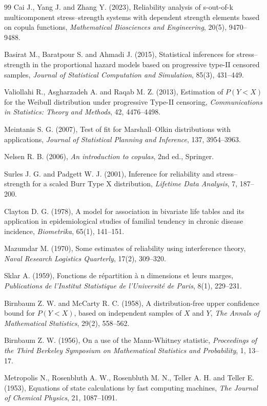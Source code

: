 \documentclass[twoside]{article}
\begin{document}
\begin{thebibliography}{99}
	Cai J., Yang J. and Zhang Y. (2023), Reliability analysis of s-out-of-k multicomponent stress--strength systems with dependent strength elements based on copula functions, {\it Mathematical Biosciences and Engineering}, 20(5), 9470--9488.
	
	
	Basirat M., Baratpour S. and Ahmadi J. (2015), Statistical inferences for stress--strength in the proportional hazard models based on progressive type-II censored samples, {\it Journal of Statistical Computation and Simulation}, 85(3), 431--449.
	
	Valiollahi R., Asgharzadeh A. and Raqab M. Z. (2013), Estimation of \(P(Y < X)\) for the Weibull distribution under progressive Type-II censoring, {\it Communications in Statistics: Theory and Methods}, 42, 4476--4498.
	
	
	Meintanis S. G. (2007), Test of fit for Marshall--Olkin distributions with applications, {\it Journal of Statistical Planning and Inference}, 137, 3954--3963.
	
	Nelsen R. B. (2006), {\it An introduction to copulas}, 2nd ed., Springer.
	
	
	Surles J. G. and Padgett W. J. (2001), Inference for reliability and stress--strength for a scaled Burr Type X distribution, {\it Lifetime Data Analysis}, 7, 187--200.
	
	
	Clayton D. G. (1978), A model for association in bivariate life tables and its application in epidemiological studies of familial tendency in chronic disease incidence, {\it Biometrika}, 65(1), 141--151.
	
	Mazumdar M. (1970), Some estimates of reliability using interference theory, {\it Naval Research Logistics Quarterly}, 17(2), 309--320.
	
	Sklar A. (1959), Fonctions de r\'{e}partition \`{a} n dimensions et leurs marges, {\it Publications de l'Institut Statistique de l'Universit\'{e} de Paris}, 8(1), 229--231.
	
	Birnbaum Z. W. and McCarty R. C. (1958), A distribution-free upper confidence bound for \(P(Y < X)\), based on independent samples of \(X\) and \(Y\), {\it The Annals of Mathematical Statistics}, 29(2), 558--562.
	
	Birnbaum Z. W. (1956), On a use of the Mann-Whitney statistic, {\it Proceedings of the Third Berkeley Symposium on Mathematical Statistics and Probability}, 1, 13--17.
	
	Metropolis N., Rosenbluth A. W., Rosenbluth M. N., Teller A. H. and Teller E. (1953), Equations of state calculations by fast computing machines, {\it The Journal of Chemical Physics}, 21, 1087--1091.
	
\end{thebibliography}
 
\end{document}
